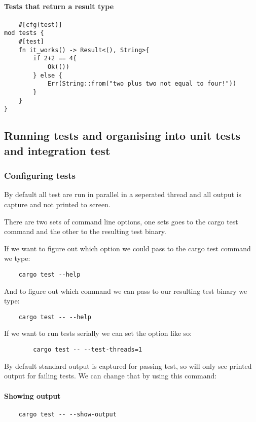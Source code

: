 \paragraph*{Tests that return a result type}\begin{lstlisting}
    #[cfg(test)]
mod tests {
    #[test]
    fn it_works() -> Result<(), String>{
        if 2+2 == 4{
            Ok(())
        } else {
            Err(String::from("two plus two not equal to four!"))
        }
    }
}
\end{lstlisting}
\subsection{Running tests and organising into unit tests and integration test}
\subsubsection{Configuring tests}
By default all test are run in parallel in a seperated thread and all output is capture and not printed to screen.


There are two sets of command line options, one sets goes to the cargo test command and the other to the resulting test binary.

If we want to figure out which option we could pass to the cargo test command we type:\begin{lstlisting}
    cargo test --help
\end{lstlisting}


And to figure out which command we can pass to our resulting test binary we type:\begin{lstlisting}
    cargo test -- --help
\end{lstlisting}

\begin{example}
    If we want to run tests serially we can set the option like so:\begin{lstlisting}
        cargo test -- --test-threads=1
    \end{lstlisting}
\end{example}

By default standard output is captured for passing test, so will only see printed output for failing tests. We can change that by using this command:
\paragraph{Showing output}\begin{lstlisting}
    cargo test -- --show-output
\end{lstlisting}

